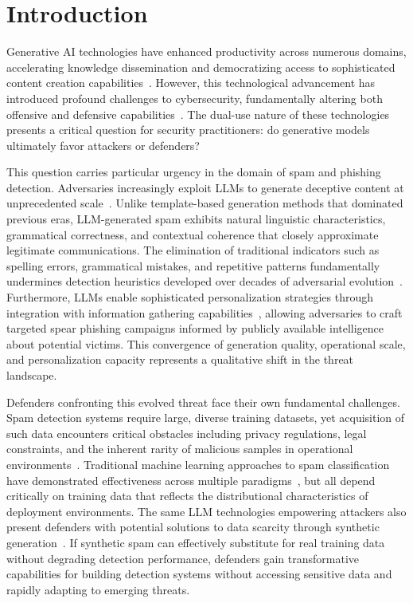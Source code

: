 \section{Introduction}
\label{sec:introduction}

Generative AI technologies have enhanced productivity across numerous domains, accelerating knowledge dissemination and democratizing access to sophisticated content creation capabilities~\cite{baldassarre2023social}. However, this technological advancement has introduced profound challenges to cybersecurity, fundamentally altering both offensive and defensive capabilities~\cite{wach2023dark}. The dual-use nature of these technologies presents a critical question for security practitioners: do generative models ultimately favor attackers or defenders?

This question carries particular urgency in the domain of spam and phishing detection. Adversaries increasingly exploit LLMs to generate deceptive content at unprecedented scale~\cite{bethany2024large,weinz2025impact}. Unlike template-based generation methods that dominated previous eras, LLM-generated spam exhibits natural linguistic characteristics, grammatical correctness, and contextual coherence that closely approximate legitimate communications. The elimination of traditional indicators such as spelling errors, grammatical mistakes, and repetitive patterns fundamentally undermines detection heuristics developed over decades of adversarial evolution~\cite{magdy2022efficient}. Furthermore, LLMs enable sophisticated personalization strategies through integration with information gathering capabilities~\cite{yu2025survey,kim2025llms}, allowing adversaries to craft targeted spear phishing campaigns informed by publicly available intelligence about potential victims. This convergence of generation quality, operational scale, and personalization capacity represents a qualitative shift in the threat landscape.

Defenders confronting this evolved threat face their own fundamental challenges. Spam detection systems require large, diverse training datasets, yet acquisition of such data encounters critical obstacles including privacy regulations, legal constraints, and the inherent rarity of malicious samples in operational environments~\cite{li2024spamdam,bazzaz2021hybrid}. Traditional machine learning approaches to spam classification have demonstrated effectiveness across multiple paradigms~\cite{wang2025hybrid}, but all depend critically on training data that reflects the distributional characteristics of deployment environments. The same LLM technologies empowering attackers also present defenders with potential solutions to data scarcity through synthetic generation~\cite{zhang2025llms}. If synthetic spam can effectively substitute for real training data without degrading detection performance, defenders gain transformative capabilities for building detection systems without accessing sensitive data and rapidly adapting to emerging threats.

